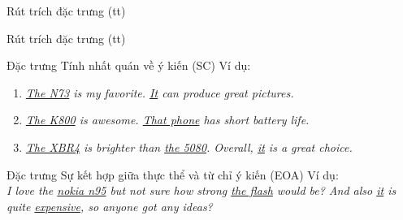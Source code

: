 \documentclass[9pt,xcolor=table,hyperref=unicode]{beamer}
\begin{document}
	\begin{frame}{Rút trích đặc trưng (tt)}		
		\begin{table}[]		
		\parbox{\textwidth}{
			\centering			
			\fontsize{8pt}{10}\selectfont		
				
			\caption{Các đặc trưng được sử dụng trong hệ thống \footnotemark \textsuperscript{,} \footnotemark}
		}
		\end{table}					
	\end{frame}	

	\begin{frame}{Rút trích đặc trưng (tt)}
		\begin{block}{Đặc trưng Tính nhất quán về ý kiến (SC)}						
			Ví dụ:\\					
			\begin{enumerate}				
				\item{\textit{\underline{The N73} is my favorite. \underline{It} can produce great pictures.}}
				\item{\textit{\underline{The K800} is awesome. \underline{That phone} has short battery life.}}
				\item{\textit{\underline{The XBR4} is brighter than \underline{the 5080}. Overall, \underline{it} is a great choice.}}
			\end{enumerate}								
		\end{block}	
		\begin{block}{Đặc trưng Sự kết hợp giữa thực thể và từ chỉ ý kiến (EOA)}			
			Ví dụ:\\
			\textit{I love the \underline{nokia n95} but not sure how strong \underline{the flash} would be? And also \underline{it} is quite \underline{expensive}, so anyone got any ideas?}			
		\end{block}			
	\end{frame}	
\end{document}
